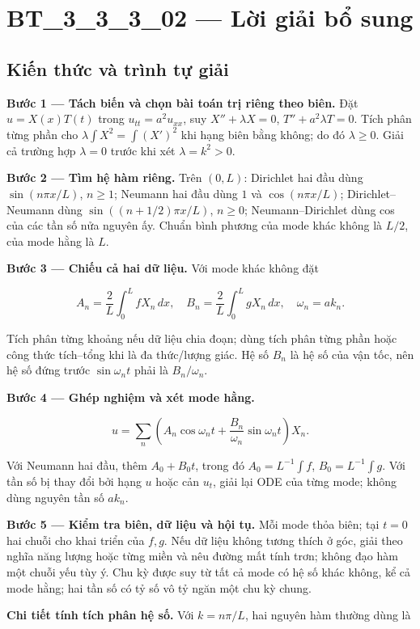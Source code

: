 \documentclass[10pt,a4paper]{article}
\begin{document}
\section*{BT\_3\_3\_3\_02 — Lời giải bổ sung}
\subsection*{Kiến thức và trình tự giải}
\textbf{Bước 1 — Tách biến và chọn bài toán trị riêng theo biên.} Đặt $u=X(x)T(t)$ trong $u_{tt}=a^2u_{xx}$, suy $X''+\lambda X=0$, $T''+a^2\lambda T=0$. Tích phân từng phần cho $\lambda\int X^2=\int (X')^2$ khi hạng biên bằng không; do đó $\lambda\ge0$. Giải cả trường hợp $\lambda=0$ trước khi xét $\lambda=k^2>0$.

\textbf{Bước 2 — Tìm hệ hàm riêng.} Trên $(0,L)$: Dirichlet hai đầu dùng $\sin(n\pi x/L)$, $n\ge1$; Neumann hai đầu dùng $1$ và $\cos(n\pi x/L)$; Dirichlet–Neumann dùng $\sin((n+1/2)\pi x/L)$, $n\ge0$; Neumann–Dirichlet dùng cos của các tần số nửa nguyên ấy. Chuẩn bình phương của mode khác không là $L/2$, của mode hằng là $L$.

\textbf{Bước 3 — Chiếu cả hai dữ liệu.} Với mode khác không đặt


\[
A_n=\frac2L\int_0^L fX_n\,dx,\quad B_n=\frac2L\int_0^L gX_n\,dx,\quad \omega_n=ak_n.
\]


Tích phân từng khoảng nếu dữ liệu chia đoạn; dùng tích phân từng phần hoặc công thức tích–tổng khi là đa thức/lượng giác. Hệ số $B_n$ là hệ số của vận tốc, nên hệ số đứng trước $\sin\omega_nt$ phải là $B_n/\omega_n$.

\textbf{Bước 4 — Ghép nghiệm và xét mode hằng.}


\[
u=\sum_n\left(A_n\cos\omega_nt+\frac{B_n}{\omega_n}\sin\omega_nt\right)X_n.
\]


Với Neumann hai đầu, thêm $A_0+B_0t$, trong đó $A_0=L^{-1}\int f$, $B_0=L^{-1}\int g$. Với tần số bị thay đổi bởi hạng $u$ hoặc cản $u_t$, giải lại ODE của từng mode; không dùng nguyên tần số $ak_n$.

\textbf{Bước 5 — Kiểm tra biên, dữ liệu và hội tụ.} Mỗi mode thỏa biên; tại $t=0$ hai chuỗi cho khai triển của $f,g$. Nếu dữ liệu không tương thích ở góc, giải theo nghĩa năng lượng hoặc từng miền và nêu đường mất tính trơn; không đạo hàm một chuỗi yếu tùy ý. Chu kỳ được suy từ tất cả mode có hệ số khác không, kể cả mode hằng; hai tần số có tỷ số vô tỷ ngăn một chu kỳ chung.

\textbf{Chi tiết tính tích phân hệ số.} Với $k=n\pi/L$, hai nguyên hàm thường dùng là
\end{document}

